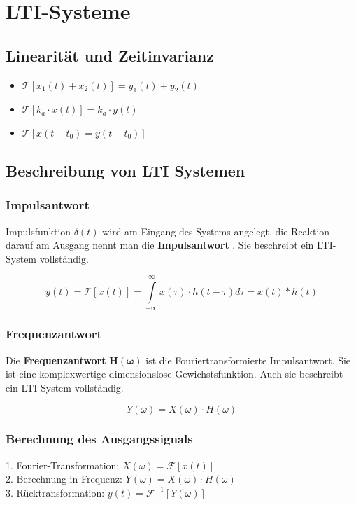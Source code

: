 \section{LTI-Systeme}
\begin{multicols}{2}
    \subsection*{Linearität und Zeitinvarianz}
    \begin{itemize}
        \item $\mathcal{T}[x_1(t) + x_2(t)] = y_1(t) + y_2(t)$
        \item $\mathcal{T}[k_a \cdot x(t)] = k_a \cdot y(t)$
        \item $\mathcal{T}[x(t-t_0) = y(t-t_0)]$
    \end{itemize}

    \subsection{Beschreibung von LTI Systemen}

    \subsubsection{Impulsantwort}
    Impulsfunktion $\delta(t)$ wird am Eingang des Systems angelegt,
    die Reaktion darauf am Ausgang nennt man die \textbf{Impulsantwort} .
    Sie beschreibt ein LTI-System vollständig.

    $$ y(t) = \mathcal{T}[x(t)]
        = \int \limits _{-\infty} ^{\infty} x(\tau) \cdot h(t-\tau)d\tau
        = x(t) * h(t)$$

    \subsubsection{Frequenzantwort}
    Die \textbf{Frequenzantwort} $\bm{H(\omega)}$ ist die Fouriertransformierte Impulsantwort.
    Sie ist eine komplexwertige dimensionslose Gewichstsfunktion.
    Auch sie beschreibt ein LTI-System vollständig.

    $$ Y(\omega) = X(\omega) \cdot H(\omega)$$

    \subsubsection{Berechnung des Ausgangssignals}
    1. Fourier-Transformation:  $X(\omega) = \mathcal{F}[x(t)]$ \\
    2. Berechnung in Frequenz:  $Y(\omega) = X(\omega) \cdot H(\omega)$ \\
    3. Rücktransformation:  $y(t) = \mathcal{F}^{-1}[Y(\omega)]$




\end{multicols}
